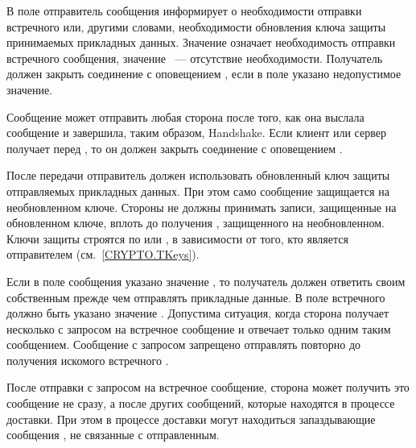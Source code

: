 В поле  отправитель сообщения информирует о 
необходимости отправки встречного  или, другими словами,
необходимости обновления ключа защиты принимаемых прикладных данных.
%
Значение  означает необходимость отправки встречного 
сообщения, значение ~--- отсутствие необходимости.
%
Получатель должен закрыть соединение с оповещением 
, если в поле указано недопустимое 
значение.

Сообщение  может отправить любая сторона после
того, как она выслала сообщение  и завершила,
таким образом, Handshake. 
%
Если клиент или сервер получает  перед 
, то он должен закрыть соединение с оповещением 
. 

После передачи  отправитель должен использовать обновленный ключ 
защиты отправляемых прикладных данных. 
%
При этом само сообщение  защищается на необновленном ключе.
%
Стороны не должны принимать записи, защищенные на обновленном ключе, вплоть до 
получения , защищенного на необновленном.
%
%
Ключи защиты строятся по  или 
, в зависимости от того, 
кто является отправителем (см.~\ref{CRYPTO.TKeys}).

Если в поле  сообщения  указано значение 
, то получатель должен ответить своим собственным
 прежде чем отправлять прикладные данные. 
%
В поле  встречного  должно быть указано 
значение .
%
Допустима ситуация, когда сторона получает несколько  с 
запросом на встречное сообщение и отвечает только одним таким сообщением.
%
Сообщение  с запросом запрещено отправлять повторно до 
получения искомого встречного .

\begin{note}
После отправки  с запросом на встречное сообщение, сторона 
может получить это сообщение не сразу, а после других сообщений, которые 
находятся в процессе доставки. При этом в процессе доставки могут находиться 
запаздывающие сообщения , не связанные с отправленным.
\end{note}

